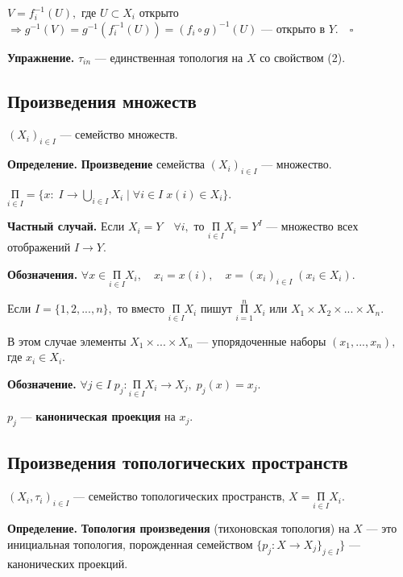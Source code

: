 \documentclass[12pt,a4paper]{article}
\begin{document}
$V = f_{i}^{-1}(U),$ где $U \subset X_{i}$ открыто $\Rightarrow g^{-1}(V) = g^{-1}(f_{i}^{-1}(U)) = (f_{i} \circ g)^{-1}(U)$ --- открыто в $Y. \quad \square$ 

\textbf{Упражнение.} $\tau_{in}$ --- единственная топология на $X$ со свойством (2).

\subsection{Произведения множеств} 

$(X_{i})_{i \in I}$ --- семейство множеств. 

\textbf{Определение.} \textbf{Произведение} семейства $(X_{i})_{i \in I}$ --- множество. 

$\underset{i \in I}{\text{П}} = \{x: \; I \to \underset{i \in I}{\bigcup} X_{i} \; | \; \forall i \in I \; x(i) \in X_{i}\}.$ 

\textbf{Частный случай.} Если $X_{i} = Y \quad \forall i,$ то $\underset{i \in I}{\text{П}} X_{i} = Y^{I}$ --- множество всех отображений $I \to Y.$

\textbf{Обозначения.} $\forall x \in \underset{i \in I}{\text{П}} X_{i}, \quad x_{i} = x(i), \quad x = (x_{i})_{i \in I} \; (x_{i} \in X_{i}).$ 

Если $I = \{1, 2, ..., n\},$ то вместо $\underset{i \in I}{\text{П}}X_{i}$ пишут $\overset{n}{\underset{i = 1}{\text{П}}}X_{i}$ или $X_{1} \times X_{2} \times ... \times X_{n}.$ 

В этом случае элементы $X_{1} \times ... \times X_{n}$ --- упорядоченные наборы $(x_{1}, ..., x_{n}),$ где $x_{i} \in X_{i}.$ 

\textbf{Обозначение.} $\forall j \in I \; p_{j}: \underset{i \in I}{\text{П}} X_{i} \to X_{j}, \; p_{j}(x) = x_{j}.$ 

$p_{j}$ --- \textbf{каноническая проекция} на $x_{j}.$ 

\subsection{Произведения топологических пространств} 

$(X_{i}, \tau_{i})_{i \in I}$ --- семейство топологических пространств, $X = \underset{i \in I}{\text{П}} X_{i}.$ 

\textbf{Определение.} \textbf{Топология произведения} (тихоновская топология) на $X$ --- это инициальная топология, порожденная семейством $\{p_{j}: X \to X_{j}\}_{j \in I}\}$ --- канонических проекций.
\end{document}
